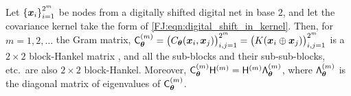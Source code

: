 \documentclass[graybox,footinfo]{svmult}
\begin{document}
\begin{lemma} \label{FJ:lemma:eig}
    Let $\left\{{\boldsymbol{x}}_i \right\}_{i=1}^{2^m}$ be nodes from a digitally shifted digital net in base $2$, and let the covariance kernel take the form of \eqref{FJ:eqn:digital_shift_in_kernel}. Then, for $m = 1, 2, \ldots$ the Gram matrix, $
	\mathsf{C}_{{\boldsymbol{\theta}}}^{(m)} = \bigl(C_{\boldsymbol{\theta}}({\boldsymbol{x}}_i, {\boldsymbol{x}}_j)\bigr)_{i,j=1}^{2^m} = \bigl(K({\boldsymbol{x}}_i \oplus {\boldsymbol{x}}_j)\bigr)_{i,j=1}^{2^m}$ is a $2\times 2$ block-Hankel matrix \cite[Definition 3.1.3]{Ber09a}, and all the sub-blocks and their sub-sub-blocks, etc.\ are also $2\times 2$ block-Hankel. Moreover, $\mathsf{C}_{{\boldsymbol{\theta}}}^{(m)} \mathsf{H}^{(m)} = \mathsf{H}^{(m)} \mathsf{\Lambda}_{{\boldsymbol{\theta}}}^{(m)}$, where $\mathsf{\Lambda}_{{\boldsymbol{\theta}}}^{(m)}$ is the diagonal matrix of eigenvalues of $\mathsf{C}_{{\boldsymbol{\theta}}}^{(m)}$.
\end{lemma}
\end{document}
